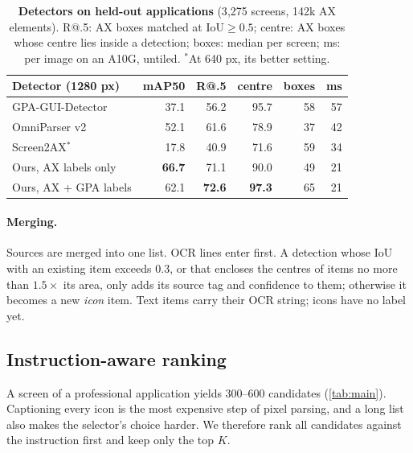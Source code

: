 \begin{table}[t]
\centering
\small
\setlength{\tabcolsep}{3.5pt}
\begin{tabular}{l rrrrr}
\toprule
Detector (1280 px) & mAP50 & R@.5 & centre & boxes & ms \\
\midrule
GPA-GUI-Detector & 37.1 & 56.2 & 95.7 & 58 & 57 \\
OmniParser v2 & 52.1 & 61.6 & 78.9 & 37 & 42 \\
Screen2AX$^\ast$ & 17.8 & 40.9 & 71.6 & 59 & 34 \\
Ours, AX labels only & \textbf{66.7} & 71.1 & 90.0 & 49 & 21 \\
Ours, AX + GPA labels & 62.1 & \textbf{72.6} & \textbf{97.3} & 65 & 21 \\
\bottomrule
\end{tabular}
\caption{\textbf{Detectors on held-out applications} (3{,}275 screens, 142k AX elements). R@.5: AX boxes matched at
IoU${\ge}0.5$; centre: AX boxes whose centre lies inside a detection; boxes: median per screen; ms: per image on an
A10G, untiled. $^\ast$At 640 px, its better setting.}
\label{tab:detector}
\end{table}

\paragraph{Merging.}
Sources are merged into one list. OCR lines enter first. A detection whose IoU with an existing item exceeds $0.3$,
or that encloses the centres of items no more than $1.5\times$ its area, only adds its source tag and confidence to
them; otherwise it becomes a new \emph{icon} item. Text items carry their OCR string; icons have no label yet.

\subsection{Instruction-aware ranking}
\label{sec:ranker}

A screen of a professional application yields 300--600 candidates (\cref{tab:main}). Captioning every icon is the
most expensive step of pixel parsing, and a long list also makes the selector's choice harder. We therefore rank
all candidates against the instruction first and keep only the top $K$.

